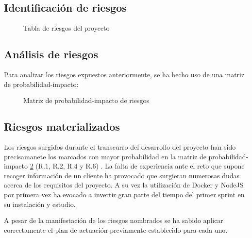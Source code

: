 \subsection{Identificación de riesgos}
\begin{figure}[H]
    \caption{Tabla de riesgos del proyecto}
    \label{fig:riesgos}
\end{figure}
\subsection{Análisis de riesgos}
Para analizar los riesgos expuestos anteriormente, se ha hecho uso de una matriz de probabilidad-impacto:

\begin{figure}[H]
    \caption{Matriz de probabilidad-impacto de riesgos}
    \label{fig:analisis-riesgos}
\end{figure}

\subsection{Riesgos materializados}
Los riesgos surgidos durante el transcurro del desarrollo del proyecto han sido precisamanete los marcados con mayor probabilidad en la matriz de probabilidad-impacto \ref{fig:analisis-riesgos} (R.1, R.2, R.4 y R.6) . La falta de experiencia ante el reto que supone recoger información de un cliente ha provocado que surgieran numerosas dudas acerca de los requisitos del proyecto. A su vez la utilización de Docker y NodeJS por primera vez ha evocado a invertir gran parte del tiempo del primer sprint en su instalación y estudio. \bigskip

A pesar de la manifestación de los riesgos nombrados se ha sabido aplicar correctamente el plan de actuación previamente establecido para cada uno.
